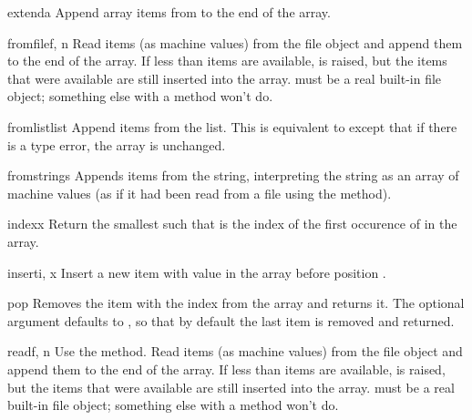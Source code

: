\begin{methoddesc}[array]{extend}{a}
Append array items from  to the end of the array.
\end{methoddesc}

\begin{methoddesc}[array]{fromfile}{f, n}
Read  items (as machine values) from the file object 
and append them to the end of the array.  If less than  items
are available,  is raised, but the items that were
available are still inserted into the array.   must be a real
built-in file object; something else with a  method won't
do.
\end{methoddesc}

\begin{methoddesc}[array]{fromlist}{list}
Append items from the list.  This is equivalent to
except that if there is a type error, the array is unchanged.
\end{methoddesc}

\begin{methoddesc}[array]{fromstring}{s}
Appends items from the string, interpreting the string as an
array of machine values (as if it had been read from a
file using the  method).
\end{methoddesc}

\begin{methoddesc}[array]{index}{x}
Return the smallest  such that  is the index of
the first occurence of  in the array.
\end{methoddesc}

\begin{methoddesc}[array]{insert}{i, x}
Insert a new item with value  in the array before position
.
\end{methoddesc}

\begin{methoddesc}[array]{pop}{}
Removes the item with the index  from the array and returns
it. The optional argument defaults to , so that by default
the last item is removed and returned. 
\end{methoddesc}

\begin{methoddesc}[array]{read}{f, n}
  {Use the  method.}
Read  items (as machine values) from the file object 
and append them to the end of the array.  If less than  items
are available,  is raised, but the items that were
available are still inserted into the array.   must be a real
built-in file object; something else with a  method won't
do.
\end{methoddesc}

